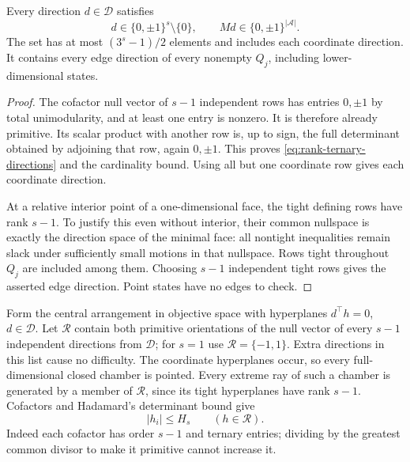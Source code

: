 \begin{lemma}\label{lem:rank-edges}
Every direction $d\in\mathcal D$ satisfies
\begin{equation}\label{eq:rank-ternary-directions}
 d\in\{0,\pm1\}^s\setminus\{0\},\qquad
                        Md\in\{0,\pm1\}^{|\mathcal A|}.
\end{equation}
The set has at most $(3^s-1)/2$ elements and includes each coordinate
direction. It contains every edge direction of every nonempty $Q_j$,
including lower-dimensional states.
\end{lemma}
\begin{proof}
The cofactor null vector of $s-1$ independent rows has entries $0,\pm1$
by total unimodularity, and at least one entry is nonzero. It is therefore
already primitive. Its scalar product with another row is, up to sign,
the full determinant obtained by adjoining that row, again $0,\pm1$.
This proves \eqref{eq:rank-ternary-directions} and the cardinality bound.
Using all but one coordinate row gives each coordinate direction.

At a relative interior point of a one-dimensional face, the tight
defining rows have rank $s-1$. To justify this even without interior,
their common nullspace is exactly the direction space of the minimal
face: all nontight inequalities remain slack under sufficiently small
motions in that nullspace. Rows tight throughout $Q_j$ are included
among them. Choosing $s-1$ independent tight rows gives the asserted
edge direction. Point states have no edges to check.
\end{proof}

Form the central arrangement in objective space with hyperplanes
$d^\top h=0$, $d\in\mathcal D$. Let $\mathcal R$ contain both
primitive orientations of the null vector of every $s-1$ independent
directions from $\mathcal D$; for $s=1$ use $\mathcal R=\{-1,1\}$.
Extra directions in this list cause no difficulty. The coordinate
hyperplanes occur, so every full-dimensional closed chamber is pointed.
Every extreme ray of such a chamber is generated by a member of
$\mathcal R$, since its tight hyperplanes have rank $s-1$.
Cofactors and Hadamard's determinant bound give
\begin{equation}\label{eq:rank-ray-bound}
 |h_i|\le H_s\qquad(h\in\mathcal R).
\end{equation}
Indeed each cofactor has order $s-1$ and ternary entries; dividing by
the greatest common divisor to make it primitive cannot increase it.

